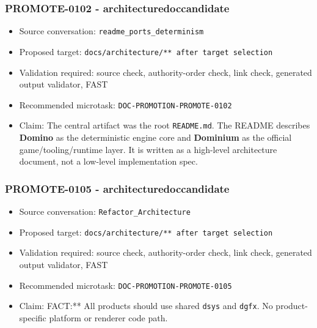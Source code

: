 \documentclass[9pt,a4paper,openany]{book}
\begin{document}
\subsubsection{PROMOTE-0102 - architecturedoccandidate}

\begin{itemize}
\item Source conversation: \texttt{readme\_\allowbreak{}ports\_\allowbreak{}determinism}
\item Proposed target: \texttt{docs/\allowbreak{}architecture/\allowbreak{}** after target selection}
\item Validation required: source check, authority-\allowbreak{}order check, link check, generated output validator, FAST
\item Recommended microtask: \texttt{DOC-\allowbreak{}PROMOTION-\allowbreak{}PROMOTE-\allowbreak{}0102}
\item Claim: The central artifact was the root \texttt{README.\allowbreak{}md}.\allowbreak{} The README describes \textbf{Domino} as the deterministic engine core and \textbf{Dominium} as the official game/\allowbreak{}tooling/\allowbreak{}runtime layer.\allowbreak{} It is written as a high-\allowbreak{}level architecture document, not a low-\allowbreak{}level implementation spec.\allowbreak{}
\end{itemize}

\subsubsection{PROMOTE-0105 - architecturedoccandidate}

\begin{itemize}
\item Source conversation: \texttt{Refactor\_\allowbreak{}Architecture}
\item Proposed target: \texttt{docs/\allowbreak{}architecture/\allowbreak{}** after target selection}
\item Validation required: source check, authority-\allowbreak{}order check, link check, generated output validator, FAST
\item Recommended microtask: \texttt{DOC-\allowbreak{}PROMOTION-\allowbreak{}PROMOTE-\allowbreak{}0105}
\item Claim: FACT:** All products should use shared \texttt{dsys} and \texttt{dgfx}.\allowbreak{} No product-\allowbreak{}specific platform or renderer code path.\allowbreak{}
\end{itemize}
\end{document}
